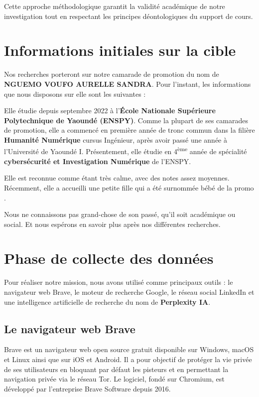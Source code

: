 \documentclass[12pt, a4paper]{article}
\begin{document}
Cette approche méthodologique garantit la validité académique de notre investigation tout en respectant les principes déontologiques du support de cours.

\section{Informations initiales sur la cible}

Nos recherches porteront sur notre camarade de promotion du nom de \textbf{NGUEMO VOUFO AURELLE SANDRA}. Pour l'instant, les informations que nous disposons sur elle sont les suivantes : 

Elle étudie depuis septembre 2022 à l'\textbf{École Nationale Supérieure Polytechnique de Yaoundé (ENSPY)}. Comme la plupart de ses camarades de promotion, elle a commencé en première année de tronc commun dans la filière \textbf{Humanité Numérique} cursus Ingénieur, après avoir passé une année à l'Université de Yaoundé I. Présentement, elle étudie en 4\textsuperscript{ème} année de spécialité \textbf{cybersécurité et Investigation Numérique} de l'ENSPY. 

Elle est reconnue comme étant très calme, avec des notes assez moyennes. Récemment, elle a accueilli une petite fille qui a été surnommée \og bébé de la promo \fg.

Nous ne connaissons pas grand-chose de son passé, qu'il soit académique ou social. Et nous espérons en savoir plus après nos différentes recherches.

\section{Phase de collecte des données}

Pour réaliser notre mission, nous avons utilisé comme principaux outils : le navigateur web Brave, le moteur de recherche Google, le réseau social LinkedIn et une intelligence artificielle de recherche du nom de \textbf{Perplexity IA}.

\subsection{Le navigateur web Brave}

Brave est un navigateur web open source gratuit disponible sur Windows, macOS et Linux ainsi que sur iOS et Android. Il a pour objectif de protéger la vie privée de ses utilisateurs en bloquant par défaut les pisteurs et en permettant la navigation privée via le réseau Tor. Le logiciel, fondé sur Chromium, est développé par l'entreprise Brave Software depuis 2016.
\end{document}
